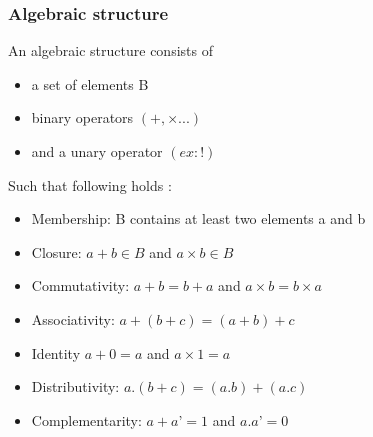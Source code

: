 \begin{frame}\frametitle{Algebraic structure}

An algebraic structure consists of
\begin{itemize}
\item 
a set of elements B 
\item 
binary operators $(+,\times ...)$
\item 
and a unary operator $(ex: !)$\end{itemize}

Such that following holds :

\begin{itemize}
\item 
Membership: B contains at least two elements a and b
 \item 
Closure:		$a+b \in  B$	and	$a\times b \in B$ \item 
Commutativity:	$a+b = b+a$	and	$a\times b = b\times a$ \item 
Associativity:	$a+(b+c)=(a+b)+c$   \item 
Identity		$a+0 =  a$		and	$a\times 1=a$ \item 
Distributivity:	 $a.(b+c)=(a.b)+(a.c)$\item 
Complementarity: $a+a’=1$ and $a.a’=0$\\
\end{itemize}

\end{frame}
